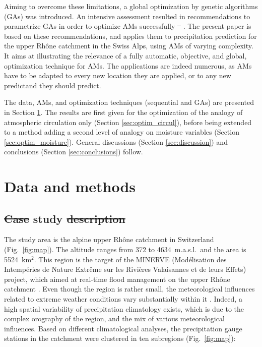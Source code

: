 \documentclass[review]{elsarticle}
\providecommand{\DIFaddtex}[1]{{\protect\color{blue}\uwave{#1}}} %
\providecommand{\DIFdeltex}[1]{{\protect\color{red}\sout{#1}}}                      %
\providecommand{\DIFaddbegin}{} %
\providecommand{\DIFaddend}{} %
\providecommand{\DIFdelbegin}{} %
\providecommand{\DIFdelend}{} %
\providecommand{\DIFadd}[1]{\texorpdfstring{\DIFaddtex{#1}}{#1}} %
\providecommand{\DIFdel}[1]{\texorpdfstring{\DIFdeltex{#1}}{}} %
\begin{document}
Aiming to overcome these limitations, a global optimization by genetic algorithms (GAs) was introduced. An intensive assessment resulted in recommendations to parametrize GAs in order to optimize AMs successfully \DIFdelbegin \DIFdel{\mbox{%
\citep{Horton2016}}%
}\DIFdelend \DIFaddbegin \DIFadd{\mbox{%
\citep{Horton2017}}%
}\DIFaddend . The present paper is based on these recommendations, and applies them to precipitation prediction for the upper Rh\^{o}ne catchment in the Swiss Alps, using AMs of varying complexity. It aims at illustrating the relevance of a fully automatic, objective, and global, optimization technique for AMs. The applications are indeed numerous, as AMs have to be adapted to every new location they are applied, or to any new predictand they should predict.

The data, AMs, and optimization techniques (sequential and GAs) are presented in Section \ref{sec:data_methods}. The results are first given for the optimization of the analogy of atmospheric circulation only (Section \ref{sec:optim_circul}), before being extended to a method adding a second level of analogy on moisture variables (Section \ref{sec:optim_moisture}). General discussions (Section \ref{sec:discussion}) and conclusions (Section \ref{sec:conclusions}) follow.


\section{Data and methods}
\label{sec:data_methods}


\subsection{\DIFdelbegin \DIFdel{Case }\DIFdelend \DIFaddbegin \DIFadd{Description of }\DIFaddend study \DIFdelbegin \DIFdel{description}\DIFdelend \DIFaddbegin \DIFadd{area}\DIFaddend }
\label{sec:case_study}

The study area is the alpine upper Rh\^{o}ne catchment in Switzerland (Fig.\ \ref{fig:map}). The altitude ranges from 372 to 4634~m.a.s.l.\ and the area is 5524~km$^{2}$. This region is the target of the MINERVE (Mod\'{e}lisation des Intemp\'{e}ries de Nature Extr\^{e}me sur les Rivi\`{e}res Valaisannes et de leurs Effets) project, which aimed at real-time flood management on the upper Rh\^{o}ne catchment \citep{GarciaHernandez2009b}. Even though the region is rather small, the meteorological influences related to extreme weather conditions vary substantially within it \citep[see][]{Horton2012}. Indeed, a high spatial variability of precipitation climatology exists, which is due to the complex orography of the region, and the mix of various meteorological influences. Based on different climatological analyses, the precipitation gauge stations in the catchment were clustered in ten subregions (Fig.\ \ref{fig:map}):
\end{document}
